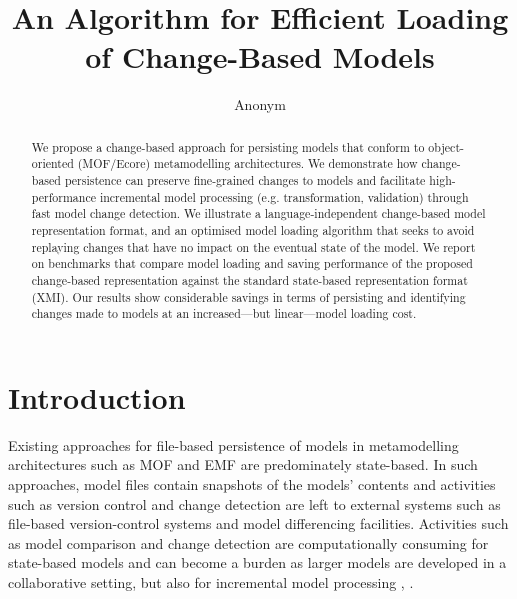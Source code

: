 \documentclass{llncs}
\begin{document}
\renewcommand{\thelstlisting}{\arabic{lstlisting}}
\renewcommand{\labelitemi}{$\bullet$}
\newcommand{\dk}[1]{\textbf{[DK: #1]}}

\title{An Algorithm for Efficient Loading \\ of Change-Based Models}
%
%
\author{
    Anonym%
}
%
%
%


\maketitle              %

\begin{abstract}
We propose a change-based approach for persisting models that conform to object-oriented (MOF/Ecore) metamodelling architectures. We demonstrate how change-based persistence can preserve fine-grained changes to models and facilitate high-performance incremental model processing (e.g. transformation, validation) through fast model change detection. We illustrate a language-independent change-based model representation format, and an optimised model loading algorithm that seeks to avoid replaying changes that have no impact on the eventual state of the model. We report on benchmarks that compare model loading and saving performance of the proposed change-based representation against the standard state-based representation format (XMI). Our results show considerable savings in terms of persisting and identifying changes made to models at an increased---but linear---model loading cost.
\end{abstract}

\section{Introduction}
\label{sec:introduction}
Existing approaches for file-based persistence of models in metamodelling architectures such as MOF and EMF are predominately state-based. In such approaches, model files contain snapshots of the models' contents and activities such as version control and change detection are left to external systems such as file-based version-control systems and model differencing facilities. Activities such as model comparison and change detection are computationally consuming for state-based models and can become a burden as larger models are developed in a collaborative setting, but also for incremental model processing \cite{rath2012derived}, \cite{ogunyomi2015property}. 
\end{document}
